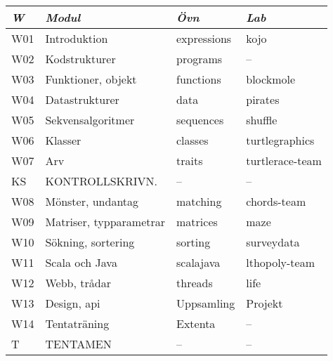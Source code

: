 \begin{tabular}{l|l|l|l}
\textit{W} & \textit{Modul} & \textit{Övn} & \textit{Lab} \\ \hline \hline
W01 & Introduktion & expressions & kojo \\
W02 & Kodstrukturer & programs & -- \\
W03 & Funktioner, objekt & functions & blockmole \\
W04 & Datastrukturer & data & pirates \\
W05 & Sekvensalgoritmer & sequences & shuffle \\
W06 & Klasser & classes & turtlegraphics \\
W07 & Arv & traits & turtlerace-team \\
KS & KONTROLLSKRIVN. & -- & -- \\
W08 & Mönster, undantag & matching & chords-team \\
W09 & Matriser, typparametrar & matrices & maze \\
W10 & Sökning, sortering & sorting & surveydata \\
W11 & Scala och Java & scalajava & lthopoly-team \\
W12 & Webb, trådar & threads & life \\
W13 & Design, api & Uppsamling & Projekt \\
W14 & Tentaträning & Extenta & -- \\
T & TENTAMEN & -- & -- \\
\end{tabular}
